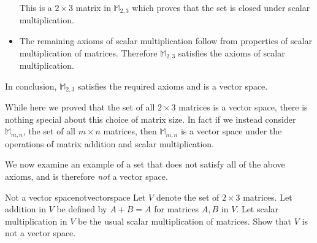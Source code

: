 \begin{solution}
\begin{itemize}
This is a $2 \times 3$ matrix in $\mathbb{M}_{2,3}$ which proves that the set is closed under scalar multiplication. 

\item The remaining axioms of scalar multiplication follow from properties of scalar multiplication of matrices. Therefore $\mathbb{M}_{2,3}$ satisfies the axioms of scalar multiplication. 
\end{itemize}

In conclusion, $\mathbb{M}_{2,3}$ satisfies the required axioms and is a vector space. 
\end{solution}

While here we proved that the set of all $2 \times 3$ matrices is a vector space, there is nothing special about this choice of matrix size. In fact if we instead consider $\mathbb{M}_{m,n}$, the set of all $m \times n$ matrices, then  $\mathbb{M}_{m,n}$ is a vector space under the operations of matrix addition and scalar multiplication. 

We now examine an example of a set that does not satisfy all of the above axioms, and is therefore \textit{not} a vector space. 

\begin{example}{Not a vector space}{notvectorspace}
Let $V$ denote the set of $2 \times 3$ matrices. Let addition in $V$ be defined by $A + B = A$ for matrices $A,B$ in $V$. Let scalar multiplication in $V$ be the usual scalar multiplication of matrices. Show that $V$ is not a vector space.
\end{example}

